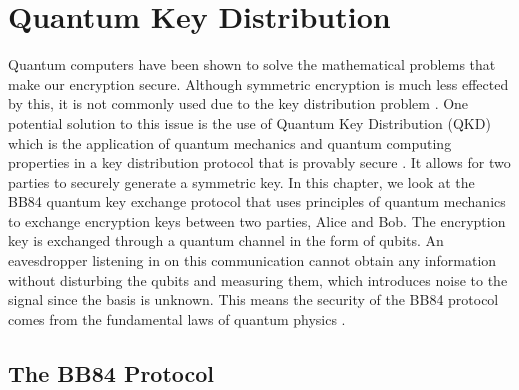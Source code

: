 \chapter{Quantum Key Distribution}
\label{chap:bb84}

Quantum computers have been shown to solve the mathematical problems that make our encryption secure.
Although symmetric encryption is much less effected by this, it is not commonly used due to the key distribution problem \cite{cryptography}.
One potential solution to this issue is the use of Quantum Key Distribution (QKD) which is the application of quantum mechanics and quantum computing properties in a key distribution protocol that is provably secure \cite{MikeAndIke}.
It allows for two parties to securely generate a symmetric key.
In this chapter, we look at the BB84 quantum key exchange protocol that uses principles of quantum mechanics to exchange encryption keys between two parties, Alice and Bob.
The encryption key is exchanged through a quantum channel in the form of qubits.
An eavesdropper listening in on this communication cannot obtain any information without disturbing the qubits and measuring them, which introduces noise to the signal since the basis is unknown. 
This means the security of the BB84 protocol comes from the fundamental laws of quantum physics \cite{MikeAndIke}.

\section{The BB84 Protocol}

